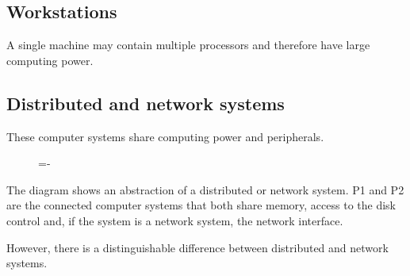 \documentclass[a4paper]{systems-software}
\begin{document}
\subsection*{Workstations}

A single machine may contain multiple processors and therefore have large computing power.


\subsection*{Distributed and network systems}

These computer systems share computing power and peripherals.

\begin{figure}[H]
  \lineskip=-\fboxrule
\end{figure}

The diagram shows an abstraction of a distributed or network system. P1 and P2 are the connected computer systems that both share memory, access to the disk control and, if the system is a network system, the network interface.

However, there is a distinguishable difference between distributed and network systems.
\end{document}
